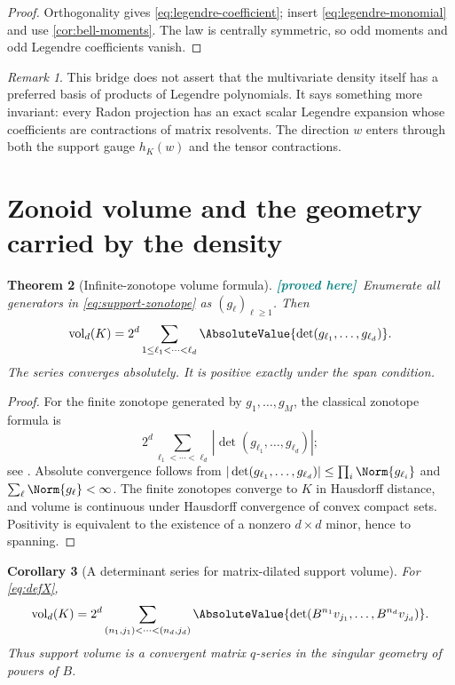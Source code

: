 \documentclass[11pt,oneside]{article}
\newtheorem{theorem}{Theorem}[section]
\newtheorem{corollary}[theorem]{Corollary}
\theoremstyle{definition}
\theoremstyle{remark}
\newtheorem{remark}[theorem]{Remark}
\newcommand{\vol}{\operatorname{vol}}
\newcommand{\New}{\textcolor{teal}{\textbf{[proved here]}}}
\begin{document}
\begin{proof}
Orthogonality gives \eqref{eq:legendre-coefficient}; insert
\eqref{eq:legendre-monomial} and use \cref{cor:bell-moments}.  The law is
centrally symmetric, so odd moments and odd Legendre coefficients vanish.
\end{proof}

\begin{remark}
This bridge does not assert that the multivariate density itself has a preferred
basis of products of Legendre polynomials.  It says something more invariant:
every Radon projection has an exact scalar Legendre expansion whose coefficients
are contractions of matrix resolvents.  The direction $w$ enters through both
the support gauge $h_K(w)$ and the tensor contractions.
\end{remark}

\section{Zonoid volume and the geometry carried by the density}
\label{sec:zonoid}

\begin{theorem}[Infinite-zonotope volume formula]
\label{thm:volume}
\New\ Enumerate all generators in \eqref{eq:support-zonotope} as
$(g_\ell)_{\ell\ge1}$.  Then
\begin{equation}
 \vol_d(K)=2^d\sum_{1\le\ell_1<\cdots<\ell_d}
 \AbsoluteValue{\det(g_{\ell_1},\ldots,g_{\ell_d})}.
 \label{eq:infinite-volume}
\end{equation}
The series converges absolutely.  It is positive exactly under the span
condition.
\end{theorem}

\begin{proof}
For the finite zonotope generated by $g_1,\ldots,g_M$, the classical zonotope
formula is
\[
 2^d\sum_{\ell_1<\cdots<\ell_d}
 |\det(g_{\ell_1},\ldots,g_{\ell_d})|;
\]
see \cite{GoverKrikorian}.  Absolute convergence follows from
$|\det(g_{\ell_1},\ldots,g_{\ell_d})|\le\prod_i\Norm{g_{\ell_i}}$ and
$\sum_\ell\Norm{g_\ell}<\infty$.  The finite zonotopes converge to $K$ in
Hausdorff distance, and volume is continuous under Hausdorff convergence of
convex compact sets.  Positivity is equivalent to the existence of a nonzero
$d\times d$ minor, hence to spanning.
\end{proof}

\begin{corollary}[A determinant series for matrix-dilated support volume]
\label{cor:matrix-volume}
For \eqref{eq:defX},
\begin{equation}
 \vol_d(K)=2^d\sum_{
 (n_1,j_1)<\cdots<(n_d,j_d)}
 \AbsoluteValue{\det(B^{n_1}v_{j_1},\ldots,B^{n_d}v_{j_d})}.
 \label{eq:matrix-volume}
\end{equation}
Thus support volume is a convergent matrix $q$-series in the singular geometry
of powers of $B$.
\end{corollary}
\end{document}
